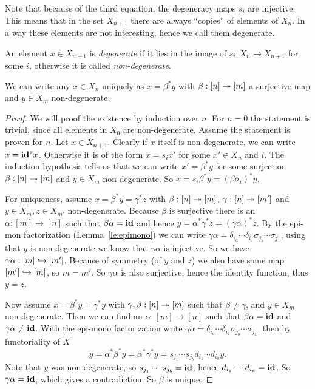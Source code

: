 Note that because of the third equation, the degeneracy maps $s_i$ are injective. This means that in the set $X_{n+1}$ there are always ``copies'' of elements of $X_n$. In a way these elements are not interesting, hence we call them degenerate.
\begin{definition}
	An element $x \in X_{n+1}$ is \emph{degenerate} if it lies in the image of $s_i : X_n \to X_{n+1}$ for some $i$, otherwise it is called \emph{non-degenerate}.
\end{definition}
\begin{lemma}
	\label{le:non-degenerate}
	We can write any $x \in X_n$ uniquely as $x = \beta^\ast y$ with $\beta : [n] \twoheadrightarrow [m]$ a surjective map and $y \in X_m$ non-degenerate.
\end{lemma}
\begin{proof}
	We will proof the existence by induction over $n$. For $n=0$ the statement is trivial, since all elements in $X_0$ are non-degenerate. Assume the statement is proven for $n$. Let $x \in X_{n+1}$. Clearly if $x$ itself is non-degenerate, we can write $x = \mathbf{id}^\ast x$. Otherwise it is of the form $x = s_i x'$ for some $x' \in X_n$ and $i$. The induction hypothesis tells us that we can write $x' = \beta^\ast y$ for some surjection $\beta: [n] \twoheadrightarrow [m]$ and $y \in X_m$ non-degenerate. So $x = s_i \beta^\ast y = (\beta \sigma_i)^\ast y$.

	For uniqueness, assume $x = \beta^\ast y = \gamma^\ast z$ with $\beta : [n] \twoheadrightarrow [m]$, $\gamma: [n] \twoheadrightarrow [m']$ and $y \in X_m, z \in X_{m'}$ non-degenerate. Because $\beta$ is surjective there is an $\alpha:[m]\to[n]$ such that $\beta\alpha = \mathbf{id}$ and hence $y = \alpha^\ast \gamma^\ast z = (\gamma\alpha)^\ast z$. By the epi-mon factorization (Lemma~\ref{le:epimono}) we can write $\gamma\alpha = \delta_{i_a} \cdots \delta_{i_1} \sigma_{j_b} \cdots \sigma_{j_1}$, using that $y$ is non-degenerate we know that $\gamma\alpha$ is injective. So we have $\gamma\alpha: [m] \hookrightarrow [m']$. Because of symmetry (of $y$ and $z$) we also have some map $[m'] \hookrightarrow[m]$, so $m = m'$. So $\gamma\alpha$ is also surjective, hence the identity function, thus $y = z$.

	Now assume $x = \beta^\ast y = \gamma^\ast y$ with $\gamma, \beta : [n] \twoheadrightarrow [m]$ such that $\beta \neq \gamma$, and $y \in X_m$ non-degenerate. Then we can find an $\alpha:[m]\to[n]$ such that $\beta\alpha = \mathbf{id}$ and $\gamma\alpha \neq \mathbf{id}$. With the epi-mono factorization write $\gamma\alpha = \delta_{i_a} \cdots \delta_{i_1} \sigma_{j_b} \cdots \sigma_{j_1}$, then by functoriality of $X$
	$$ y = \alpha^\ast \beta^\ast y = \alpha^\ast \gamma^\ast y = s_{j_1} \cdots s_{j_b} d_{i_1} \cdots d_{i_a} y. $$
	Note that $y$ was non-degenerate, so $s_{j_1} \cdots s_{j_b} = \mathbf{id}$, hence $d_{i_1} \cdots d_{i_a} = \mathbf{id}$. So $\gamma\alpha = \mathbf{id}$, which gives a contradiction. So $\beta$ is unique.
\end{proof}

